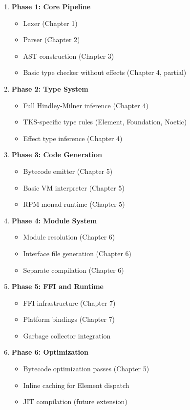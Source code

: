 \begin{enumerate}
  \item \textbf{Phase 1: Core Pipeline}
    \begin{itemize}
      \item Lexer (Chapter 1)
      \item Parser (Chapter 2)
      \item AST construction (Chapter 3)
      \item Basic type checker without effects (Chapter 4, partial)
    \end{itemize}

  \item \textbf{Phase 2: Type System}
    \begin{itemize}
      \item Full Hindley-Milner inference (Chapter 4)
      \item TKS-specific type rules (Element, Foundation, Noetic)
      \item Effect type inference (Chapter 4)
    \end{itemize}

  \item \textbf{Phase 3: Code Generation}
    \begin{itemize}
      \item Bytecode emitter (Chapter 5)
      \item Basic VM interpreter (Chapter 5)
      \item RPM monad runtime (Chapter 5)
    \end{itemize}

  \item \textbf{Phase 4: Module System}
    \begin{itemize}
      \item Module resolution (Chapter 6)
      \item Interface file generation (Chapter 6)
      \item Separate compilation (Chapter 6)
    \end{itemize}

  \item \textbf{Phase 5: FFI and Runtime}
    \begin{itemize}
      \item FFI infrastructure (Chapter 7)
      \item Platform bindings (Chapter 7)
      \item Garbage collector integration
    \end{itemize}

  \item \textbf{Phase 6: Optimization}
    \begin{itemize}
      \item Bytecode optimization passes (Chapter 5)
      \item Inline caching for Element dispatch
      \item JIT compilation (future extension)
    \end{itemize}
\end{enumerate}

